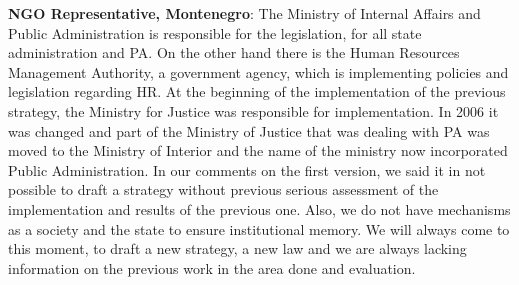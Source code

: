\textbf{NGO Representative, Montenegro}: The Ministry of Internal Affairs and Public Administration is responsible for the legislation,  for all state administration and PA. On the other hand there is the Human Resources Management Authority, a government agency, which is implementing policies and legislation regarding HR. At the beginning of the implementation of the previous strategy, the Ministry for Justice was responsible for implementation. In 2006 it was changed and part of the Ministry of Justice that was dealing with PA was moved to the Ministry of Interior and the name of the ministry now incorporated Public Administration. In our comments on the first version, we said it in not possible to draft a strategy without previous serious assessment of the implementation and results of the previous one. Also, we do not have mechanisms as a society and the state to ensure institutional memory. We will always come to this moment, to draft a new strategy, a new law and we are always lacking information on the previous work in the area done and evaluation.%
